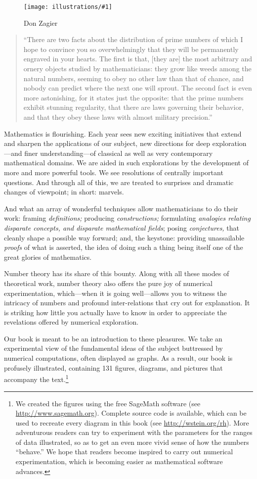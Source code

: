 \documentclass[openany]{book}
\newcommand{\ill}[3]{%
   \begin{figure}[H]%
   \vspace{-2ex}
   \centering%
   \texttt{[image: illustrations/\#1]}%
   \caption{#3}%
   \vspace{-2ex}
    \end{figure}}
\theoremstyle{plain}
\theoremstyle{definition}
\begin{document}
\ill{zagier}{.35}{Don Zagier}


\begin{quote}
  ``There are two facts about the distribution of prime numbers of
  which I hope to convince you so overwhelmingly that they will be
  permanently engraved in your hearts. The first is that, [they are]
  the most arbitrary and ornery objects studied by mathematicians:
  they grow like weeds among the natural numbers, seeming to obey no
  other law than that of chance, and nobody can predict where the next
  one will sprout. The second fact is even more astonishing, for it
  states just the opposite: that the prime numbers exhibit stunning
  regularity, that there are laws governing their behavior, and that
  they obey these laws with almost military precision.''
\end{quote}


 Mathematics is flourishing.  Each year sees new exciting initiatives that extend and sharpen the applications of our subject,   new directions for  deep  exploration---and finer understanding---of  classical as well as very contemporary mathematical domains. We are aided in such explorations by the development of more and more powerful tools. We  see resolutions of centrally important questions.  And through all of this, we are treated to surprises and dramatic changes of viewpoint; in short: marvels.

 And what an array of wonderful techniques  allow mathematicians to do their work:  framing {\it definitions;} producing {\it constructions;} formulating {\it analogies relating disparate concepts, and disparate  mathematical fields}; posing {\it  conjectures,} that cleanly shape a possible way forward; and, the keystone: providing unassailable {\it proofs} of what is asserted,  the idea of doing such a thing being itself one of the great glories of mathematics.

    Number theory has its share of this bounty. Along with all these modes of theoretical work,  number theory also offers the pure joy of numerical experimentation, which---when it is going well---allows you to witness the intricacy of numbers and  profound inter-relations that cry out for explanation. It is striking how little you actually have to know in order to appreciate the  revelations offered by numerical exploration.

    Our book is meant to be an introduction to these pleasures. We take an experimental view of the fundamental ideas of the subject  buttressed by numerical computations, often displayed as graphs. As a result, our book is profusely illustrated, containing 131 figures,
diagrams, and pictures that accompany the text.\footnote{We created the
  figures using the free SageMath
  software (see \url{http://www.sagemath.org}).
Complete source code is available, which
can be used to recreate every diagram in this book
(see \url{http://wstein.org/rh}).
More adventurous readers can try
to experiment with the parameters for
the ranges of data illustrated, so as to get an even more
vivid sense of how the numbers ``behave.''
We hope that readers become inspired to carry out numerical experimentation,
which is becoming easier  as mathematical software
advances.}
\end{document}
